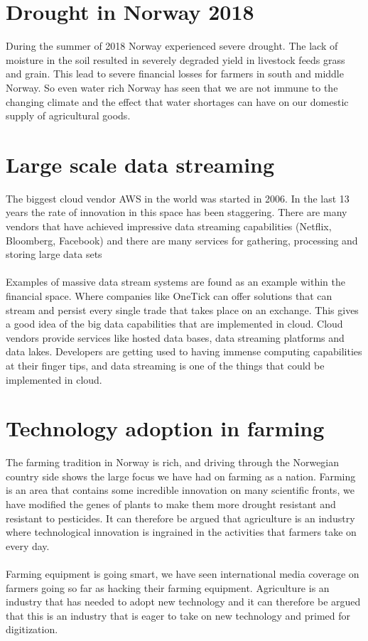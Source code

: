 \documentclass[]{uiophd}
\begin{document}
\section{Drought in Norway 2018}
 During the summer of 2018 Norway experienced severe drought. The lack of moisture in the soil resulted in severely degraded yield in livestock feeds grass and grain. This lead to severe financial losses for farmers in south and middle Norway. \cite{nve} So even water rich Norway has seen that we are not immune to the changing climate and the effect that water shortages can have on our domestic supply of agricultural goods. 

\section{Large scale data streaming }
The biggest cloud vendor AWS in the world was started in 2006. \cite{Gartner} In the last 13 years the rate of innovation in this space has been staggering. \cite{AWS} There are many vendors that have achieved impressive data streaming capabilities (Netflix, Bloomberg, Facebook) and there are many services for gathering, processing and storing large data sets
\\\\
Examples of massive data stream systems are found as an example within the financial space. Where companies like OneTick can offer solutions that can stream and persist every single trade that takes place on an exchange. This gives a good idea of the big data capabilities that are implemented in cloud. \cite{OneTick} Cloud vendors provide services like hosted data bases, data streaming platforms and data lakes. Developers are getting used to having immense computing capabilities at their finger tips, and data streaming is one of the things that could be implemented in cloud.  
\section{Technology adoption in farming}
The farming tradition in Norway is rich, and driving through the Norwegian country side shows the large focus we have had on farming as a nation. Farming is an area that contains some incredible innovation on many scientific fronts, we have modified the genes of plants to make them more drought resistant and resistant to pesticides. It can therefore be argued that agriculture is an industry where technological innovation is ingrained in the activities that farmers take on every day.
\\\\
Farming equipment is going smart, we have seen international media coverage on farmers going so far as hacking their farming equipment. Agriculture is an industry that has needed to adopt new technology and it can therefore be argued that this is an industry that is eager to take on new technology and primed for digitization.\cite{motherboard}
\\\\
\end{document}

